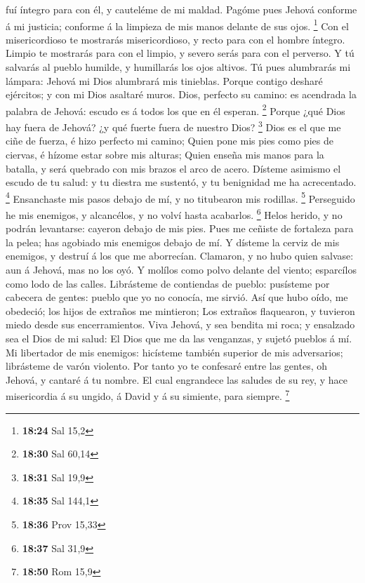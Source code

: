 fuí íntegro para con él, y cauteléme de mi maldad.  Pagóme
pues Jehová conforme á mi justicia; conforme á la limpieza de mis manos
delante de sus ojos. \footnote{\textbf{18:24} Sal 15,2} 
Con el misericordioso te mostrarás misericordioso, y recto para con el
hombre íntegro.  Limpio te mostrarás para con el limpio, y
severo serás para con el perverso.  Y tú salvarás al pueblo
humilde, y humillarás los ojos altivos.  Tú pues alumbrarás
mi lámpara: Jehová mi Dios alumbrará mis tinieblas.  Porque
contigo desharé ejércitos; y con mi Dios asaltaré muros. 
Dios, perfecto su camino: es acendrada la palabra de Jehová: escudo es á
todos los que en él esperan. \footnote{\textbf{18:30} Sal 60,14}
 Porque ¿qué Dios hay fuera de Jehová? ¿y qué fuerte fuera
de nuestro Dios? \footnote{\textbf{18:31} Sal 19,9}  Dios
es el que me ciñe de fuerza, é hizo perfecto mi camino; 
Quien pone mis pies como pies de ciervas, é hízome estar sobre mis
alturas;  Quien enseña mis manos para la batalla, y será
quebrado con mis brazos el arco de acero.  Dísteme asimismo
el escudo de tu salud: y tu diestra me sustentó, y tu benignidad me ha
acrecentado. \footnote{\textbf{18:35} Sal 144,1} 
Ensanchaste mis pasos debajo de mí, y no titubearon mis rodillas.
\footnote{\textbf{18:36} Prov 15,33}  Perseguido he mis
enemigos, y alcancélos, y no volví hasta acabarlos. \footnote{\textbf{18:37}
  Sal 31,9}  Helos herido, y no podrán levantarse: cayeron
debajo de mis pies.  Pues me ceñiste de fortaleza para la
pelea; has agobiado mis enemigos debajo de mí.  Y dísteme
la cerviz de mis enemigos, y destruí á los que me aborrecían.
 Clamaron, y no hubo quien salvase: aun á Jehová, mas no
los oyó.  Y molílos como polvo delante del viento;
esparcílos como lodo de las calles.  Librásteme de
contiendas de pueblo: pusísteme por cabecera de gentes: pueblo que yo no
conocía, me sirvió.  Así que hubo oído, me obedeció; los
hijos de extraños me mintieron;  Los extraños flaquearon, y
tuvieron miedo desde sus encerramientos.  Viva Jehová, y
sea bendita mi roca; y ensalzado sea el Dios de mi salud: 
El Dios que me da las venganzas, y sujetó pueblos á mí.  Mi
libertador de mis enemigos: hicísteme también superior de mis
adversarios; librásteme de varón violento.  Por tanto yo te
confesaré entre las gentes, oh Jehová, y cantaré á tu nombre.
 El cual engrandece las saludes de su rey, y hace
misericordia á su ungido, á David y á su simiente, para siempre.
\footnote{\textbf{18:50} Rom 15,9}

